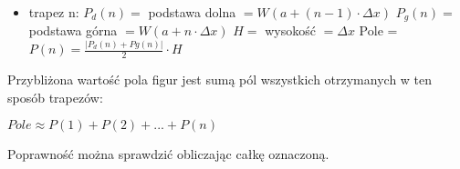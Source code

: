 \documentclass[a4paper,11pt]{article}
\begin{document}
\begin{flushleft}
\begin{itemize}
\item trapez n:
\newline
$P_{d}\left( n \right) =$ podstawa dolna $= W\left( a + \left( n - 1 \right) \cdot \Delta x \right)$
\newline
$P_{g}\left( n \right) =$ podstawa górna $= W\left( a + n \cdot \Delta x \right)$
\newline
$H =$ wysokość $= \Delta x$
\newline
Pole = $P\left( n \right) = \frac{\vert P_{d}\left( n \right) + P{g}\left( n \right)\vert}{2} \cdot H$
\end{itemize}
Przybliżona wartość pola figur jest sumą pól wszystkich otrzymanych w ten sposób trapezów:
\end{flushleft}
\begin{center}
$Pole \approx P\left( 1 \right) + P\left( 2 \right) + ... +P\left( n \right)$
\end{center}
\begin{flushleft}
Poprawność można sprawdzić obliczając całkę oznaczoną.
\end{flushleft}
\end{document}
